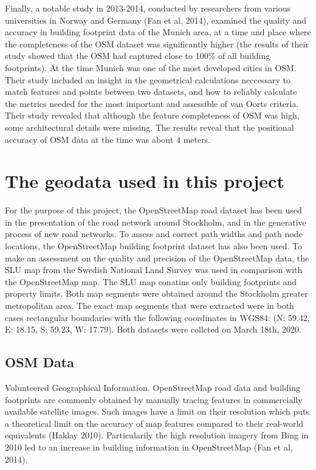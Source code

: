 \documentclass[a4paper]{article}
\begin{document}
Finally, a notable study in 2013-2014, conducted by researchers from various universities in Norway and Germany (Fan et al, 2014), examined the quality and accuracy in building footprint data of the Munich area, at a time and place where the completeness of the OSM dataset was significantly higher (the results of their study showed that the OSM had captured close to 100\% of all building footprints). At the time Munich was one of the most developed cities in OSM. Their study included an insight in the geometrical calculations neccessary to match features and points between two datasets, and how to reliably calculate the metrics needed for the most important and assessible of van Oorts criteria. Their study revealed that although the feature completeness of OSM was high, some architectural details were missing. The results reveal that the positional accuracy of OSM data at the time was about 4 meters.

\section{The geodata used in this project}

For the purpose of this project, the OpenStreetMap road dataset has been used in the presentation of the road network around Stockholm, and in the generative process of new road networks. To assess and correct path widths and path node locations, the OpenStreetMap building footprint dataset has also been used. To make an assessment on the quality and precision of the OpenStreetMap data, the SLU map from the Swedish National Land Survey was used in comparison with the OpenStreetMap map. The SLU map conatins only building footprints and property limits. Both map segments were obtained around the Stockholm greater metropolitan area.
The exact map segments that were extracted were in both cases rectangular boundaries with the following coordinates in WGS84: (N: 59.42, E: 18.15, S: 59.23, W: 17.79).
Both datasets were collcted on March 18th, 2020.

\subsection{OSM Data}

Volunteered Geographical Information.
OpenStreetMap road data and building footprints are commonly obtained by manually tracing features in commercially available satellite images. Such images have a limit on their resolution which puts a theoretical limit on the accuracy of map features compared to their real-world equivalents (Haklay 2010). Particularily the high resolution imagery from Bing in 2010 led to an increase in building information in OpenStreetMap (Fan et al, 2014).
\end{document}
